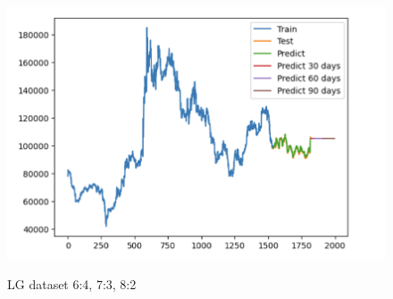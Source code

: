 \documentclass[conference]{IEEEtran}
\begin{document}
\begin{figure}[H]
\begin{minipage}{0.15\textwidth}
    \label{fig:2}
    \end{minipage}%
    \begin{minipage}{0.15\textwidth}
    \centering
    \includegraphics[width=1\textwidth]{Image/Light GBM/LightGBM_LG_8_2.png}

    \label{fig:3}
    \end{minipage}
    \caption{LG dataset  6:4, 7:3, 8:2 }
\end{figure}
\end{document}
